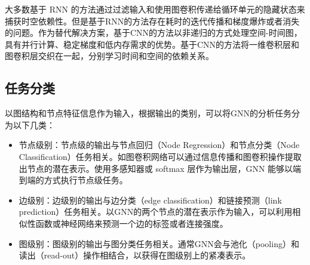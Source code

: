 大多数基于 RNN 的方法通过过滤输入和使用图卷积传递给循环单元的隐藏状态来捕获时空依赖性。但是基于RNN的方法存在耗时的迭代传播和梯度爆炸或者消失的问题。作为替代解决方案，基于CNN的方法以非递归的方式处理空间-时间图，具有并行计算、稳定梯度和低内存需求的优势。基于CNN的方法将一维卷积层和图卷积层交织在一起，分别学习时间和空间的依赖关系。

\subsection{任务分类}
以图结构和节点特征信息作为输入，根据输出的类别，可以将GNN的分析任务分为以下几类：
\begin{itemize}
\item 节点级别：节点级的输出与节点回归（Node Regression）和节点分类（Node Classification）任务相关。如图卷积网络可以通过信息传播和图卷积操作提取出节点的潜在表示。使用多感知器或 softmax 层作为输出层，GNN 能够以端到端的方式执行节点级任务。
\item 边级别：边级别的输出与边分类（edge classification）和链接预测（link prediction）任务相关。以GNN的两个节点的潜在表示作为输入，可以利用相似性函数或神经网络来预测一个边的标签或者连接强度。
\item 图级别：图级别的输出与图分类任务相关。通常GNN会与池化（pooling）和读出（read-out）操作相结合，以获得在图级别上的紧凑表示。
\end{itemize}

